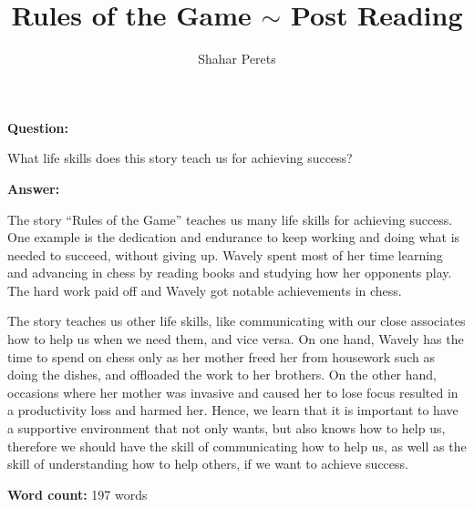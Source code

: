 \documentclass[]{../../../tex/classes/styledArticle}
\author{Shahar Perets}
\title{{\Huge \frakfamily Rules of the \frakfamily Game} $\sim$ Post Reading}
\begin{document}
	\maketitle
	
	\large
	\textbf{Question: }
	
	What life skills does this story teach us for achieving success?
	
	\textbf{Answer: }
	
	The story ``Rules of the Game'' teaches us many life skills for achieving success. One example is the dedication and endurance to keep working and doing what is needed to succeed, without giving up. Wavely spent most of her time learning and advancing in chess by reading books and studying how her opponents play. The hard work paid off and Wavely got notable achievements in chess. 
	
	The story teaches us other life skills, like communicating with our close associates how to help us when we need them, and vice versa. On one hand, Wavely has the time to spend on chess only as her mother freed her from housework such as doing the dishes, and offloaded the work to her brothers. On the other hand, occasions where her mother was invasive and caused her to lose focus resulted in a productivity loss and harmed her. Hence, we learn that it is important to have a supportive environment that not only wants, but also knows how to help us, therefore we should have the skill of communicating how to help us, as well as the skill of understanding how to help others, if we want to achieve success. 
	
	\textbf{Word count: }197 words
	
	
	
	
	
\end{document}
